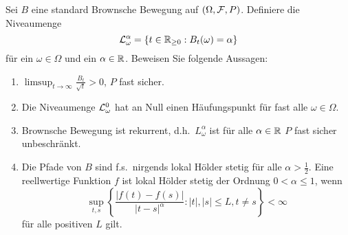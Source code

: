 Sei $B$ eine standard Brownsche Bewegung auf $(\Omega, \mathcal F, P)$. Definiere die
Niveaumenge 
\begin{equation*}
    \mathcal L_{\omega}^{\alpha} = \left\{ t\in\mathbb R_{\geq 0} : B_t(\omega)=\alpha \right\}
\end{equation*}
für ein $\omega\in\Omega$ und ein $\alpha\in\mathbb R$. 
Beweisen Sie folgende Aussagen:
\begin{enumerate}
    \item $\limsup_{t\to \infty} \frac{B_t}{\sqrt{t}} > 0$, $P$ fast sicher. 
    \item Die Niveaumenge $\mathcal L_\omega^{0}$ hat an Null einen Häufungspunkt
        für fast alle $\omega\in \Omega$. 
    \item Brownsche Bewegung ist rekurrent, d.h.\ $L_\omega^{\alpha}$ ist für alle
        $\alpha\in\mathbb R$ $P$ fast sicher unbeschränkt. 
    \item Die Pfade von $B$ sind f.s.\ nirgends lokal Hölder stetig für alle 
        $\alpha>\frac{1}{2}$. Eine reellwertige Funktion $f$ ist lokal Hölder
        stetig der Ordnung $0<\alpha\leq 1$, wenn 
        \begin{equation*}
            \sup_{t,s} \left\{ \frac{ | f(t)-f(s) | }{ | t-s |^{\alpha}} : 
            |t|,|s| \leq L, t\neq s \right\} < \infty
        \end{equation*}
        für alle positiven $L$ gilt. 
\end{enumerate}
\solution 
